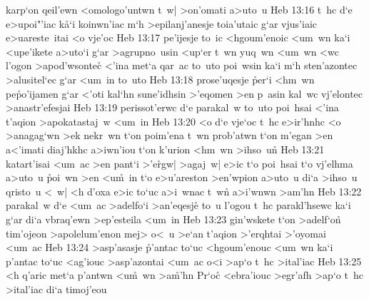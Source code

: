 karp`on
qeil'ewn
<omologo'untwn
t~w|
>on'omati
a>uto~u\bibvsend
\vs Heb 13:16
t~hc
d`e
e>upoi"'iac
k\r{a}`i
koinwn'iac
m`h
>epilanj'anesje
toia'utaic
g`ar
vjus'iaic
e>uareste~itai
<o
vje'oc\bibvsend
\vs Heb 13:17
pe'ijesje
to~ic
<hgoum'enoic
<um~wn
ka`i
<upe'ikete
a>uto`i
g`ar
>agrupno~usin
<up`er
t~wn
yuq~wn
<um~wn
<wc
l'ogon
>apod'wsonte\r{c}
<'ina
met`a
qar~ac
to~uto
poi~wsin
ka`i
m`h
sten'azontec
>alusitel`ec
g`ar
<um~in
to~uto\bibvsend
\vs Heb 13:18
prose'uqesje
\r{p}er`i
<hm~wn
pe\r{p}o'ijamen
g`ar
<'oti
kal`hn
sune'idhsin
>'eqomen
>en
p~asin
kal~wc
vj'elontec
>anastr'efesjai\bibvsend
\vs Heb 13:19
perissot'erwc
d`e
parakal~w
to~uto
poi~hsai
<'ina
t'aqion
>apokatastaj~w
<um~in\bibvsend
\vs Heb 13:20
<o
d`e
vje`oc
t~hc
e>ir'hnhc
<o
>anagag`wn
>ek
nekr~wn
t`on
poim'ena
t~wn
prob'atwn
t`on
m'egan
>en
a<'imati
diaj'hkhc
a>iwn'iou
t`on
k'urion
<hm~wn
>ihso~u\r{n}\bibvsend
{}
\vs Heb 13:21
katart'isai
<um~ac
>en
pant`i
>'e\r{r}gw|
>agaj~w|
e>ic
t`o
poi~hsai
t`o
vj'elhma
a>uto~u
\r{p}oi~wn
>en
<u\r{m}~in
t`o
e>u'areston
>en'wpion
a>uto~u
di`a
>ihso~u
qristo~u
<~w|
<h
d'oxa
e>ic
to`uc
a>i~wnac
t~wn\r{}
a>i'wnwn
>am'hn\bibvsend
\vs Heb 13:22
parakal~w
d`e
<um~ac
>adelfo`i
>an'eqesj\r{e}
to~u
l'ogou
t~hc
parakl'hsewc
ka`i
g`ar
di`a
vbraq'ewn
>ep'esteila
<um~in\bibvsend
\vs Heb 13:23
gin'wskete
t`on
>adelf`o\r{n}
tim'ojeon
>apolelum'enon
mej>
o<~u
>e`an
t'aqion
>'erqhtai
>'oyomai
<um~ac\bibvsend
\vs Heb 13:24
>asp'asasje
\r{p}'antac
to`uc
<hgoum'enouc
<um~wn
ka`i
p'antac
to`uc
<ag'iouc
>asp'azontai
<um~ac
o<i
>ap`o
t~hc
>ital'iac\bibvsend
\vs Heb 13:25
<h
q'aric
met`a
p'antwn
<u\r{m}~wn
>a\r{m}'hn\bibvsend
{}
Pr`oc\r{}
<ebra'iouc
>egr'afh
>ap`o
t~hc
>ital'iac
di`a
timoj'eou\bibvsend
